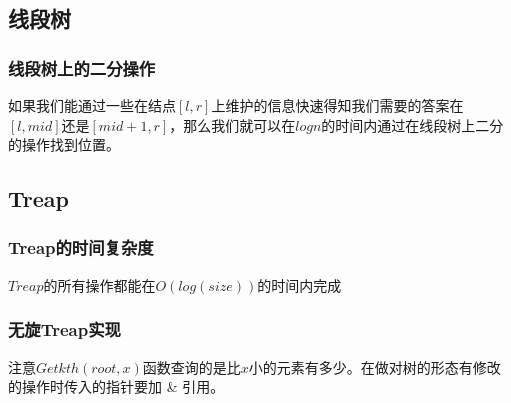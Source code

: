 \documentclass[11pt]{article}
\begin{document}
\subsection{线段树}
\label{sec:org829b5e0}
\subsubsection{线段树上的二分操作}
\label{sec:org3ebeec1}

如果我们能通过一些在结点\([l,r]\)上维护的信息快速得知我们需要的答案在\([l,mid]\)还是\([mid+1,r]\)，那么我们就可以在\(logn\)的时间内通过在线段树上二分的操作找到位置。
\subsection{Treap}
\label{sec:org915d349}

\subsubsection{Treap的时间复杂度}
\label{sec:org8d142f3}

\(Treap\)的所有操作都能在\(O(log(size))\)的时间内完成

\subsubsection{无旋Treap实现}
\label{sec:org25a89fb}

注意\(Getkth(root,x)\)函数查询的是比\(x\)小的元素有多少。在做对树的形态有修改的操作时传入的指针要加 \& 引用。
\end{document}

